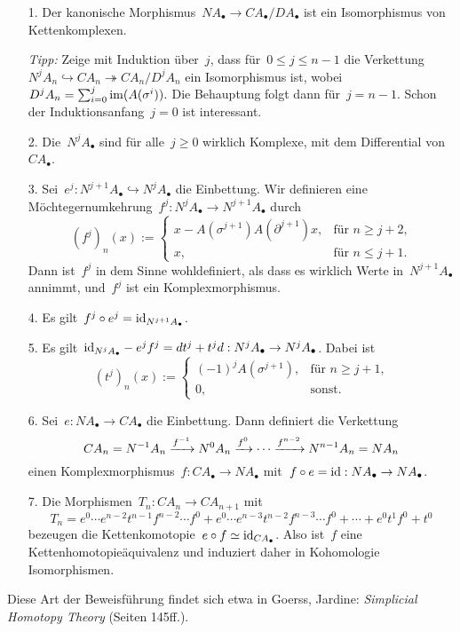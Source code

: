 \documentclass{uebblatt}
\begin{document}
\begin{enumerate}
\item[1.] Der kanonische Morphismus~$NA_\bullet \to CA_\bullet/DA_\bullet$ ist
ein Isomorphismus von Kettenkomplexen.

\emph{Tipp:} Zeige mit Induktion über~$j$, dass für~$0 \leq j \leq n-1$ die
Verkettung~$N^j A_n \hookrightarrow CA_n \twoheadrightarrow CA_n/D^jA_n$ ein
Isomorphismus ist, wobei~$D^j A_n = \sum_{i=0}^j \operatorname{im}(A(\sigma^i)).$
Die Behauptung folgt dann für~$j = n-1$. Schon der Induktionsanfang~$j = 0$ ist
interessant.

\item[2.] Die~$N^j A_\bullet$ sind für alle~$j \geq 0$ wirklich Komplexe, mit
dem Differential von~$CA_\bullet$.

\item[3.] Sei~$e^j : N^{j+1}A_\bullet \hookrightarrow N^jA_\bullet$ die
Einbettung. Wir definieren eine Möchtegernumkehrung~$f^j : N^jA_\bullet \to
N^{j+1}A_\bullet$ durch
\[ (f^j)_n(x) := \begin{cases}
  x - A(\sigma^{j+1}) A(\partial^{j+1})x, &
  \text{für $n \geq j+2$,} \\
  x, & \text{für $n \leq j+1$}. \end{cases} \]
Dann ist~$f^j$ in dem Sinne wohldefiniert, als dass es wirklich Werte
in~$N^{j+1}A_\bullet$ annimmt, und~$f^j$ ist ein Komplexmorphismus.

\item[4.] Es gilt~$f^j \circ e^j = \mathrm{id}_{N^{j+1}A_\bullet}$.

\item[5.] Es gilt~$\mathrm{id}_{N^jA_\bullet} - e^j f^j = d t^j + t^j d : N^jA_\bullet \to
N^jA_\bullet$. Dabei ist
\[ (t^j)_n(x) := \begin{cases}
  (-1)^j A(\sigma^{j+1}), & \text{für $n \geq j+1$,} \\
  0, & \text{sonst.} \end{cases} \]

\item[6.] Sei~$e : NA_\bullet \to CA_\bullet$ die Einbettung. Dann definiert
die Verkettung
\[ CA_n = N^{-1}A_n \xrightarrow{f^{-1}} N^0A_n \xrightarrow{f^0} \cdots \xrightarrow{f^{n-2}} N^{n-1}A_n =
NA_n \]
einen Komplexmorphismus~$f : CA_\bullet \to NA_\bullet$ mit~$f \circ e = \mathrm{id} :
NA_\bullet \to NA_\bullet$.

\item[7.] Die Morphismen~$T_n : CA_n \to CA_{n+1}$ mit
\[ T_n = e^0 \cdots e^{n-2} t^{n-1} f^{n-2} \cdots f^0 +
  e^0 \cdots e^{n-3} t^{n-2} f^{n-3} \cdots f^0 + \cdots +
  e^0 t^1 f^0 + t^0 \]
bezeugen die Kettenkomotopie~$e \circ f \simeq \mathrm{id}_{CA_\bullet}$. Also ist~$f$
eine Kettenhomotopieäquivalenz und induziert daher in Kohomologie
Isomorphismen.
\end{enumerate}

Diese Art der Beweisführung findet sich etwa in Goerss, Jardine:
\emph{Simplicial Homotopy Theory} (Seiten 145ff.).
\end{document}

